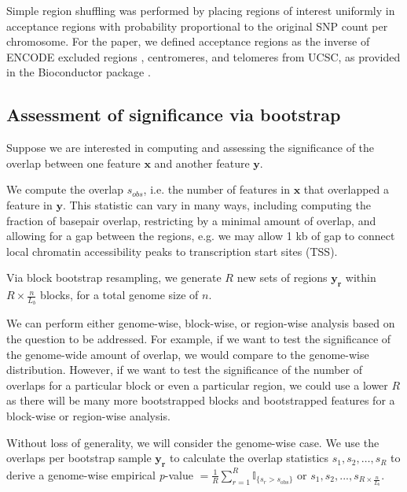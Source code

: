 \documentclass{article}
\begin{document}
Simple region shuffling was performed by placing regions of interest
uniformly in acceptance regions with probability proportional to the
original SNP count per chromosome. For the paper, we defined
acceptance regions as the inverse of
ENCODE excluded regions ,
centromeres, and telomeres from UCSC,
as provided in the  Bioconductor package
\citep{excluderanges}.

\subsection{Assessment of significance via bootstrap}

Suppose we are interested in computing and assessing the significance
of the overlap between one feature
$\bm{x}$ and another feature $\bm{y}$.

We compute the overlap $s_{obs}$, i.e. the number of 
features in $\bm{x}$ that overlapped a feature in $\bm{y}$.
This statistic can vary in many ways, including computing the fraction of
basepair overlap, restricting by a minimal amount of overlap, and
allowing for a gap between the regions, e.g. we may allow 1 kb of gap
to connect local chromatin accessibility peaks to transcription start
sites (TSS).

Via block bootstrap resampling, we generate $R$ new
sets of regions $\bm{y_r}$ within $R \times \frac{n}{L_b}$ blocks, for
a total genome size of $n$.

We can perform either genome-wise, block-wise, or region-wise analysis
based on the question to be addressed. For example, if we want to test
the significance of the genome-wide amount of overlap, we would compare
to the genome-wise distribution. However, if we want to
test the significance of the number of overlaps for a particular
block or even a particular region, we could use a lower $R$ as there
will be many more bootstrapped blocks and bootstrapped features for a
block-wise or region-wise analysis.

Without loss of generality, we will consider the genome-wise case.
We use the overlaps per bootstrap sample $\bm{y_r}$ to calculate the
overlap statistics $s_{1}, s_{2}, \dots, s_{R}$
to derive a genome-wise empirical \textit{p}-value
$= \frac{1}{R} \sum_{r=1}^R \mathbb{I}_{\{s_r > s_\text{obs}\}}$ or
$s_{1}, s_{2},..., s_{R\times \frac{n}{L_b}}$.
\end{document}
